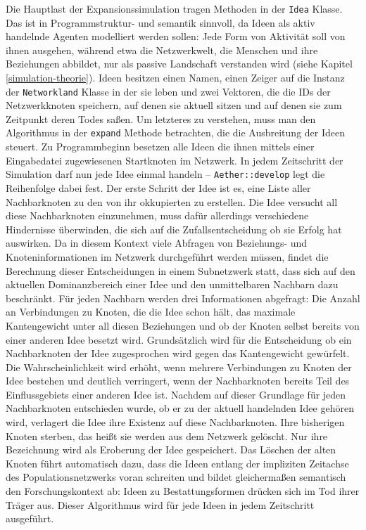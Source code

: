 \documentclass[openany,twoside,twocolumn]{book}
\begin{document}
Die Hauptlast der Expansionssimulation tragen Methoden in der
\texttt{Idea} Klasse. Das ist in Programmstruktur- und semantik
sinnvoll, da Ideen als aktiv handelnde Agenten modelliert werden sollen:
Jede Form von Aktivität soll von ihnen ausgehen, während etwa die
Netzwerkwelt, die Menschen und ihre Beziehungen abbildet, nur als
passive Landschaft verstanden wird (siehe Kapitel
\ref{simulation-theorie}). Ideen besitzen einen Namen, einen Zeiger auf
die Instanz der \texttt{Networkland} Klasse in der sie leben und zwei
Vektoren, die die IDs der Netzwerkknoten speichern, auf denen sie
aktuell sitzen und auf denen sie zum Zeitpunkt deren Todes saßen. Um
letzteres zu verstehen, muss man den Algorithmus in der \texttt{expand}
Methode betrachten, die die Ausbreitung der Ideen steuert. Zu
Programmbeginn besetzen alle Ideen die ihnen mittels einer Eingabedatei
zugewiesenen Startknoten im Netzwerk. In jedem Zeitschritt der
Simulation darf nun jede Idee einmal handeln -- \texttt{Aether::develop}
legt die Reihenfolge dabei fest. Der erste Schritt der Idee ist es, eine
Liste aller Nachbarknoten zu den von ihr okkupierten zu erstellen. Die
Idee versucht all diese Nachbarknoten einzunehmen, muss dafür allerdings
verschiedene Hindernisse überwinden, die sich auf die
Zufallsentscheidung ob sie Erfolg hat auswirken. Da in diesem Kontext
viele Abfragen von Beziehungs- und Knoteninformationen im Netzwerk
durchgeführt werden müssen, findet die Berechnung dieser Entscheidungen
in einem Subnetzwerk statt, dass sich auf den aktuellen Dominanzbereich
einer Idee und den unmittelbaren Nachbarn dazu beschränkt. Für jeden
Nachbarn werden drei Informationen abgefragt: Die Anzahl an Verbindungen
zu Knoten, die die Idee schon hält, das maximale Kantengewicht unter all
diesen Beziehungen und ob der Knoten selbst bereits von einer anderen
Idee besetzt wird. Grundsätzlich wird für die Entscheidung ob ein
Nachbarknoten der Idee zugesprochen wird gegen das Kantengewicht
gewürfelt. Die Wahrscheinlichkeit wird erhöht, wenn mehrere Verbindungen
zu Knoten der Idee bestehen und deutlich verringert, wenn der
Nachbarknoten bereits Teil des Einflussgebiets einer anderen Idee ist.
Nachdem auf dieser Grundlage für jeden Nachbarknoten entschieden wurde,
ob er zu der aktuell handelnden Idee gehören wird, verlagert die Idee
ihre Existenz auf diese Nachbarknoten. Ihre bisherigen Knoten sterben,
das heißt sie werden aus dem Netzwerk gelöscht. Nur ihre Bezeichnung
wird als Eroberung der Idee gespeichert. Das Löschen der alten Knoten
führt automatisch dazu, dass die Ideen entlang der impliziten Zeitachse
des Populationsnetzwerks voran schreiten und bildet gleichermaßen
semantisch den Forschungskontext ab: Ideen zu Bestattungsformen drücken
sich im Tod ihrer Träger aus. Dieser Algorithmus wird für jede Ideen in
jedem Zeitschritt ausgeführt.
\end{document}
